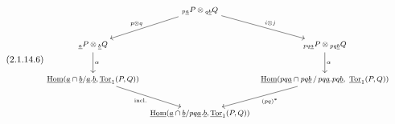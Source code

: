 \begin{equation}\tag{2.1.14.6}
{\footnotesize \begin{tikzcd}[row sep=large, column sep=tiny]
& {}_{p\underline{a}}P \otimes {}_{q\underline{b}}Q \arrow[dl, "p{\otimes}q"'] \arrow[dr, "i{\otimes}j"] & \\
{}_{\underline{a}}P \otimes {}_{\underline{b}}Q \arrow[d, "\alpha"] & & {}_{pq\underline{a}}P \otimes {}_{pq\underline{b}}Q \arrow[d, "\alpha"] \\
\underline{\mathrm{Hom}}(\underline{a}\cap\underline{b}/\underline{a}.\underline{b},\underline{\mathrm{Tor}}_1(P,Q)) \arrow[dr, "\mathrm{incl.}"'] & & \underline{\mathrm{Hom}}(pq\underline{a}\cap pq\underline{b} \,/\, pq\underline{a}.pq\underline{b},\ \underline{\mathrm{Tor}}_1(P,Q)) \arrow[dl, "(pq)^{*}"] \\
& \underline{\mathrm{Hom}}(\underline{a}\cap\underline{b}/pq\underline{a}.\underline{b},\underline{\mathrm{Tor}}_1(P,Q)) &
\end{tikzcd}}
\end{equation}
